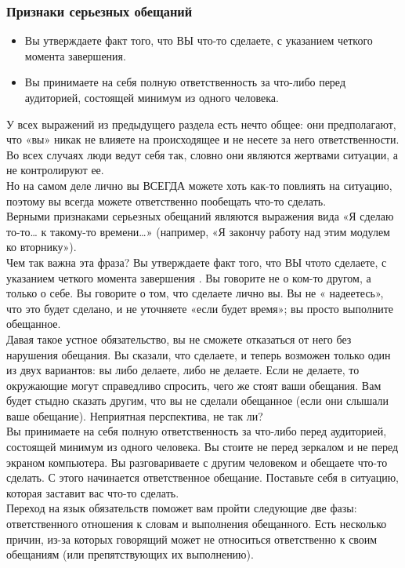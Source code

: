 \documentclass{../industrial-development}
\begin{document}
\begin{frame} \frametitle{Признаки серьезных обещаний}
\begin{itemize}
	\item Вы утверждаете факт того, что ВЫ что-то сделаете, с указанием четкого момента завершения.
	\item Вы принимаете на себя полную ответственность за что-либо перед аудиторией, состоящей минимум из одного человека.
\end{itemize}
\end{frame}
\lecturenotes
У всех выражений из предыдущего раздела есть нечто общее: они предполагают, что «вы» никак не влияете на происходящее и не несете за него ответственности. Во всех случаях люди ведут себя так, словно они являются жертвами ситуации, а не контролируют ее.\\
Но на самом деле лично вы ВСЕГДА можете хоть как-то повлиять на ситуацию, поэтому вы всегда можете ответственно пообещать что-то сделать.\\
Верными признаками серьезных обещаний являются выражения вида «Я сделаю то-то… к такому-то времени…» (например, «Я закончу работу над этим модулем ко вторнику»).\\
Чем так важна эта фраза? Вы утверждаете факт того, что ВЫ чтото сделаете, с указанием четкого момента завершения . Вы говорите не о ком-то другом, а только о себе. Вы говорите о том, что сделаете лично вы. Вы не « надеетесь», что это будет сделано, и не уточняете «если будет время»; вы просто выполните обещанное.\\
Давая такое устное обязательство, вы не сможете отказаться от него без нарушения обещания. Вы сказали, что сделаете, и теперь возможен только один из двух вариантов: вы либо делаете, либо не делаете. Если не делаете, то окружающие могут справедливо спросить, чего же стоят ваши обещания. Вам будет стыдно сказать другим, что вы не сделали обещанное (если они слышали ваше обещание). Неприятная перспектива, не так ли?\\
Вы принимаете на себя полную ответственность за что-либо перед аудиторией, состоящей минимум из одного человека. Вы стоите не
перед зеркалом и не перед экраном компьютера. Вы разговариваете с другим человеком и обещаете что-то сделать. С этого  начинается ответственное обещание. Поставьте себя в ситуацию, которая заставит вас что-то сделать.\\
Переход на язык обязательств поможет вам пройти следующие две фазы: ответственного отношения к словам и выполнения обещанного. Есть несколько причин, из-за которых говорящий может не относиться ответственно к своим обещаниям (или препятствующих их выполнению).
\end{document}
